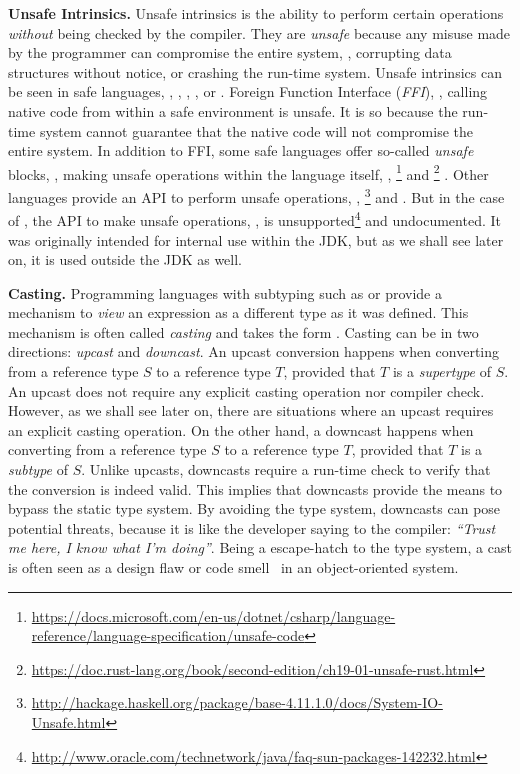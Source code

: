 \textbf{Unsafe Intrinsics.}
Unsafe intrinsics is the ability to perform certain operations \emph{without} being checked by the compiler.
They are \emph{unsafe} because any misuse made by the programmer can compromise the entire system, \eg{},
corrupting data structures without notice, or
crashing the run-time system.
Unsafe intrinsics can be seen in safe languages, \eg{},
,
,
, or
.
Foreign Function Interface (\emph{FFI}), \ie{}, calling native code from within a safe environment is unsafe.
It is so because the run-time system cannot guarantee that the native code will not compromise the entire system.
In addition to FFI, some safe languages offer so-called \emph{unsafe} blocks, \ie{}, making unsafe operations within the language itself, \eg{},
\footnote{\url{https://docs.microsoft.com/en-us/dotnet/csharp/language-reference/language-specification/unsafe-code}}
and
\footnote{\url{https://doc.rust-lang.org/book/second-edition/ch19-01-unsafe-rust.html}}
.
Other languages provide an API to perform unsafe operations, \eg{},
\footnote{\url{http://hackage.haskell.org/package/base-4.11.1.0/docs/System-IO-Unsafe.html}}
and
.
But in the case of , the API to make unsafe operations,
,
is unsupported\footnote{\url{http://www.oracle.com/technetwork/java/faq-sun-packages-142232.html}}
and undocumented.
It was originally intended for internal use within the JDK, but as we shall see later on, it is used outside the JDK as well.

\textbf{Casting.}
Programming languages with subtyping such as \java{} or \cpp{} provide a mechanism to \emph{view} an expression as a different type as it was defined.
This mechanism is often called \emph{casting} and takes the form .
Casting can be in two directions: \emph{upcast} and \emph{downcast}.
An upcast conversion happens when converting from a reference type $S$ to a reference type $T$, provided that $T$ is a \emph{supertype} of $S$.
An upcast does not require any explicit casting operation nor compiler check.
However, as we shall see later on, there are situations where an upcast requires an explicit casting operation.
On the other hand, a downcast happens when converting from a reference type $S$ to a reference type $T$, provided that $T$ is a \emph{subtype} of $S$.
Unlike upcasts, downcasts require a run-time check to verify that the conversion is indeed valid.
This implies that downcasts provide the means to bypass the static type system.
By avoiding the type system, downcasts can pose potential threats, because it is like the developer saying to the compiler: \emph{``Trust me here, I know what I'm doing''}.
Being a escape-hatch to the type system, a cast is often seen as a design flaw or code smell~\cite{tufanoWhenWhyYour2015} in an object-oriented system.


